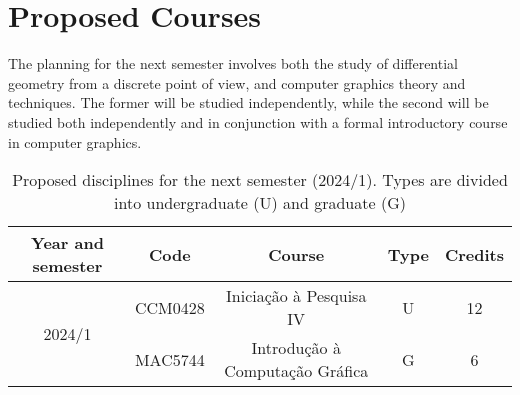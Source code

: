 \documentclass[11pt,reqno]{amsart}
\theoremstyle{definition}
\begin{document}
\section{Proposed Courses}\label{sec:courses}

The planning for the next semester involves both the study of differential geometry from a discrete
point of view, and computer graphics theory and techniques. The former will be studied
independently, while the second will be studied both independently and in conjunction with a formal
introductory course in computer graphics.

\begin{table}[h!]\label{tab:courses}
  \centering
  \caption{
      Proposed disciplines for the next semester (2024/1). Types are divided into undergraduate (U)
      and graduate (G)
  }
  \begin{tabular}{ |c|c|c|c|c| }
    \hline
    Year and semester & Code & Course & Type & Credits \\
    \hline
    \multirow{2}{*}{2024/1}
                      & CCM0428 & Iniciação à Pesquisa IV         & U & 12 \\ 
                      & MAC5744 & Introdução à Computação Gráfica & G & 6 \\
    \hline
\end{tabular}
\end{table}

\printbibliography
\end{document}
